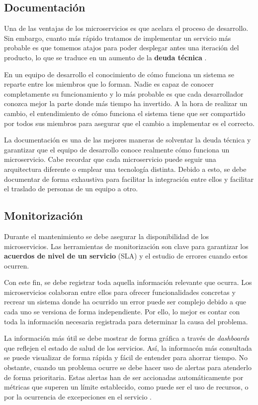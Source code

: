 \documentclass[11pt,spanish,listoffigures]{tfgetsinf}
\begin{document}
\subsection{Documentación}

Una de las ventajas de los microservicios es que acelara el proceso de desarrollo. Sin embargo, cuanto más rápido tratamos de implementar un servicio más probable es que tomemos atajos para poder desplegar antes una iteración del producto, lo que se traduce en un aumento de la \textbf{deuda técnica} \cite{FowlerSusan}.

En un equipo de desarrollo el conocimiento de cómo funciona un sistema se reparte entre los miembros que lo forman. Nadie es capaz de conocer completamente su funcionamiento y lo más probable es que cada desarrollador conozca mejor la parte donde más tiempo ha invertido. A la hora de realizar un cambio, el entendimiento de cómo funciona el sistema tiene que ser compartido por todos sus miembros para asegurar que el cambio a implementar es el correcto.

La documentación es una de las mejores maneras de solventar la deuda técnica y garantizar que el equipo de desarrollo conoce realmente cómo funciona un microservicio. Cabe recordar que cada microservicio puede seguir una arquitectura diferente o emplear una tecnología distinta. Debido a esto, se debe documentar de forma exhaustiva para facilitar la integración entre ellos y facilitar el traslado de personas de un equipo a otro.

\subsection{Monitorización}

Durante el mantenimiento se debe asegurar la disponibilidad de los microservicios. Las herramientas de monitorización son clave para garantizar los \textbf{acuerdos de nivel de un servicio} (SLA) y el estudio de errores cuando estos ocurren.

Con este fin, se debe registrar toda aquella información relevante que ocurra. Los microservicios colaboran entre ellos para ofrecer funcionalidades concretas y recrear un sistema donde ha ocurrido un error puede ser complejo debido a que cada uno se versiona de forma independiente. Por ello, lo mejor es contar con toda la información necesaria registrada para determinar la causa del problema.

La información más útil se debe mostrar de forma gráfica a través de \textit{dashboards} que reflejen el estado de salud de los servicios. Así, la informacón más consultada se puede visualizar de forma rápida y fácil de entender para ahorrar tiempo. No obstante, cuando un problema ocurre se debe hacer uso de alertas para atenderlo de forma prioritaria. Estas alertas han de ser accionadas automáticamente por métricas que superen un límite establecido, como puede ser el uso de recursos, o por la ocurrencia de excepeciones en el servicio \cite{FowlerSusan}. 
\end{document}
